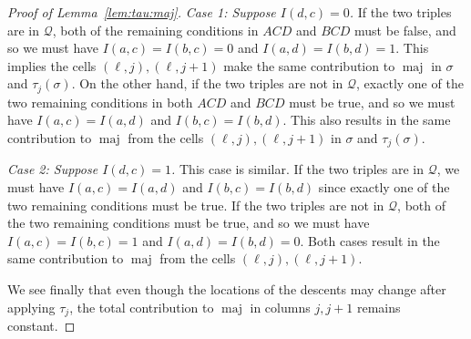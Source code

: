\documentclass[11pt]{article}
\theoremstyle{definition}
\numberwithin{equation}{section}
\DeclareMathOperator{\maj}{maj}
\newcommand{\cQ}{\mathcal{Q}}
\begin{document}
\begin{proof}[Proof of Lemma~\ref{lem:tau:maj}]
\emph{Case 1: Suppose $I(d,c)=0$.} If the two triples are in $\cQ$, both of the remaining conditions in $ACD$ and $BCD$ must be false, and so we must have $I(a,c)=I(b,c)=0$ and $I(a,d)=I(b,d)=1$. This implies the cells $(\ell,j),(\ell,j+1)$ make the same contribution to $\maj$ in $\sigma$ and $\tau_j(\sigma)$. On the other hand, if the two triples are not in $\cQ$, exactly one of the two remaining conditions in both $ACD$ and $BCD$ must be true, and so we must have $I(a,c)=I(a,d)$ and $I(b,c)=I(b,d)$. This also results in the same contribution to $\maj$ from the cells $(\ell,j),(\ell,j+1)$ in $\sigma$ and $\tau_j(\sigma)$.

\emph{Case 2: Suppose $I(d,c)=1$.} This case is similar. If the two triples are in $\cQ$, we must have $I(a,c)=I(a,d)$ and $I(b,c)=I(b,d)$ since exactly one of the two remaining conditions must be true. If the two triples are not in $\cQ$, both of the two remaining conditions must be true, and so we must have $I(a,c)=I(b,c)=1$ and $I(a,d)=I(b,d)=0$. Both cases result in the same contribution to $\maj$ from the cells $(\ell,j),(\ell,j+1)$.

We see finally that even though the locations of the descents may change after applying $\tau_j$, the total contribution to $\maj$ in columns $j,j+1$ remains constant.
\end{proof}
\end{document}
